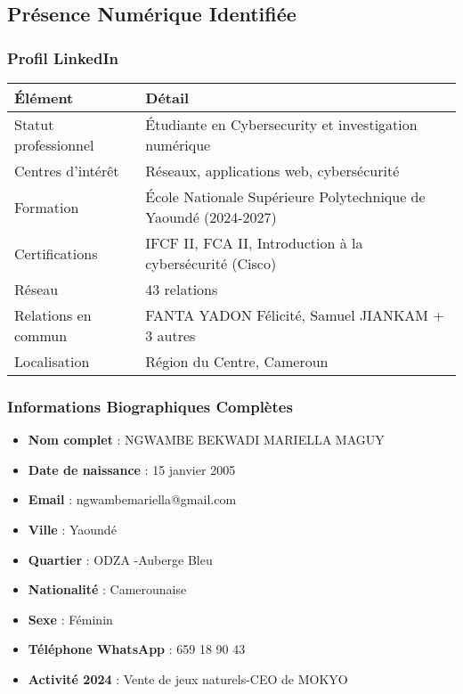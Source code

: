 \documentclass[12pt, a4paper]{article}
\begin{document}
\subsection{Présence Numérique Identifiée}

\subsubsection{Profil LinkedIn}
\begin{table}[H]
\centering
\begin{tabular}{|p{5cm}|p{8cm}|}
\hline
\textbf{Élément} & \textbf{Détail} \\
\hline
Statut professionnel & Étudiante en Cybersecurity et investigation numérique \\
\hline
Centres d'intérêt & Réseaux, applications web, cybersécurité \\
\hline
Formation & École Nationale Supérieure Polytechnique de Yaoundé (2024-2027) \\
\hline
Certifications & IFCF II, FCA II, Introduction à la cybersécurité (Cisco) \\
\hline
Réseau & 43 relations \\
\hline
Relations en commun & FANTA YADON Félicité, Samuel JIANKAM + 3 autres \\
\hline
Localisation & Région du Centre, Cameroun \\
\hline
\end{tabular}
\end{table}

\subsubsection{Informations Biographiques Complètes}
\begin{itemize}
    \item \textbf{Nom complet} : NGWAMBE BEKWADI MARIELLA MAGUY
    \item \textbf{Date de naissance} : 15 janvier 2005
    \item \textbf{Email} : ngwambemariella@gmail.com
    \item \textbf{Ville} : Yaoundé 
    \item \textbf{Quartier} : ODZA -Auberge Bleu
    \item \textbf{Nationalité} : Camerounaise
    \item \textbf{Sexe} : Féminin
    \item \textbf{Téléphone WhatsApp} : 659 18 90 43
    \item \textbf{Activité 2024} : Vente de jeux naturels-CEO de MOKYO
\end{itemize}
\end{document}
